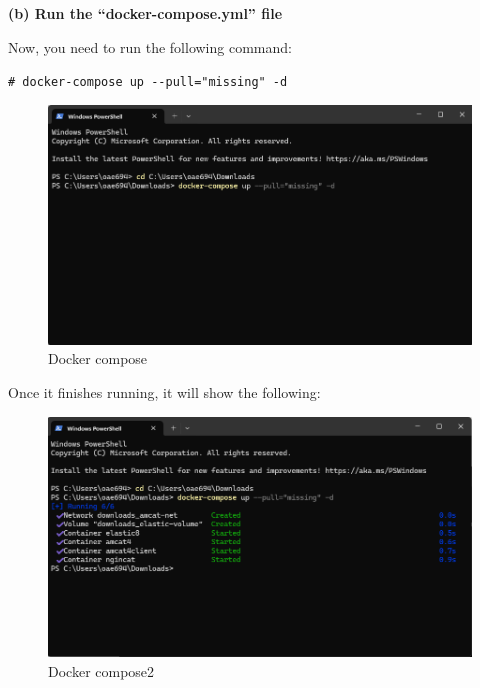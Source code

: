\documentclass[
  letterpaper,
  DIV=11,
  numbers=noendperiod]{scrreprt}
\begin{document}
\textbf{(b) Run the ``docker-compose.yml'' file}

Now, you need to run the following command:

\texttt{\#\ docker-compose\ up\ -\/-pull="missing"\ -d}

\begin{figure}[H]

{\centering \includegraphics[width=6.25in,height=\textheight]{media/amcat-2.1.2_14.png}

}

\caption{Docker compose}

\end{figure}%

Once it finishes running, it will show the following:

\begin{figure}[H]

{\centering \includegraphics[width=6.25in,height=\textheight]{media/amcat-2.1.2_15.png}

}

\caption{Docker compose2}

\end{figure}%
\end{document}
